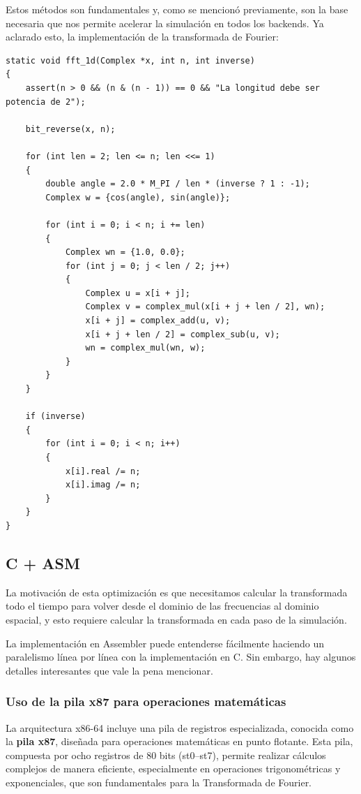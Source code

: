 \documentclass[a4paper]{article}
\begin{document}
Estos métodos son fundamentales y, como se mencionó previamente, son la base necesaria que nos permite acelerar la simulación en todos los backends. Ya aclarado esto, la implementación de la transformada de Fourier:

\begin{verbatim}
static void fft_1d(Complex *x, int n, int inverse)
{
    assert(n > 0 && (n & (n - 1)) == 0 && "La longitud debe ser potencia de 2");

    bit_reverse(x, n);

    for (int len = 2; len <= n; len <<= 1)
    {
        double angle = 2.0 * M_PI / len * (inverse ? 1 : -1);
        Complex w = {cos(angle), sin(angle)};

        for (int i = 0; i < n; i += len)
        {
            Complex wn = {1.0, 0.0};
            for (int j = 0; j < len / 2; j++)
            {
                Complex u = x[i + j];
                Complex v = complex_mul(x[i + j + len / 2], wn);
                x[i + j] = complex_add(u, v);
                x[i + j + len / 2] = complex_sub(u, v);
                wn = complex_mul(wn, w);
            }
        }
    }

    if (inverse)
    {
        for (int i = 0; i < n; i++)
        {
            x[i].real /= n;
            x[i].imag /= n;
        }
    }
}
\end{verbatim}

\subsection{C + ASM}

La motivación de esta optimización es que necesitamos calcular la transformada todo el tiempo para volver desde el dominio de las frecuencias al dominio espacial, y esto requiere calcular la transformada en cada paso de la simulación.

La implementación en Assembler puede entenderse fácilmente haciendo un paralelismo línea por línea con la implementación en C. Sin embargo, hay algunos detalles interesantes que vale la pena mencionar.

\subsubsection{Uso de la pila x87 para operaciones matemáticas}
La arquitectura x86-64 incluye una pila de registros especializada, conocida como la \textbf{pila x87}, diseñada para operaciones matemáticas en punto flotante.
Esta pila, compuesta por ocho registros de 80 bits (st0--st7), permite realizar cálculos complejos de manera eficiente, especialmente en operaciones trigonométricas
y exponenciales, que son fundamentales para la Transformada de Fourier.
\end{document}

